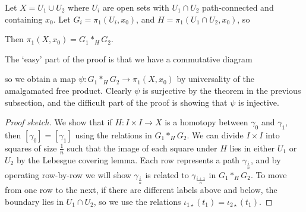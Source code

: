 \begin{theorem}
	Let \( X = U_1 \cup U_2 \) where \( U_i \) are open sets with \( U_1 \cap U_2 \) path-connected and containing \( x_0 \).
	Let \( G_i = \pi_1(U_i, x_0) \), and \( H = \pi_1(U_1 \cap U_2, x_0) \), so
	\begin{center}
	\end{center}
	Then \( \pi_1(X, x_0) = G_1 \ast_H G_2 \).
\end{theorem}
\begin{remark}
	The `easy' part of the proof is that we have a commutative diagram
	\begin{center}
	\end{center}
	so we obtain a map \( \psi \colon G_1 \ast_H G_2 \to \pi_1(X,x_0) \) by universality of the amalgamated free product.
	Clearly \( \psi \) is surjective by the theorem in the previous subsection, and the difficult part of the proof is showing that \( \psi \) is injective.
\end{remark}
\begin{proof}[Proof sketch]
	We show that if \( H \colon I \times I \to X \) is a homotopy between \( \gamma_0 \) and \( \gamma_1 \), then \( [\gamma_0] = [\gamma_1] \) using the relations in \( G_1 \ast_H G_2 \).
	We can divide \( I \times I \) into squares of size \( \frac{1}{n} \) such that the image of each square under \( H \) lies in either \( U_1 \) or \( U_2 \) by the Lebesgue covering lemma.
	Each row represents a path \( \gamma_{\frac{i}{n}} \), and by operating row-by-row we will show \( \gamma_{\frac{i}{n}} \) is related to \( \gamma_{\frac{i+1}{n}} \) in \( G_1 \ast_H G_2 \).
	To move from one row to the next, if there are different labels above and below, the boundary lies in \( U_1 \cap U_2 \), so we use the relations \( \iota_{1\star}(t_1) = \iota_{2\star}(t_1) \).
\end{proof}
